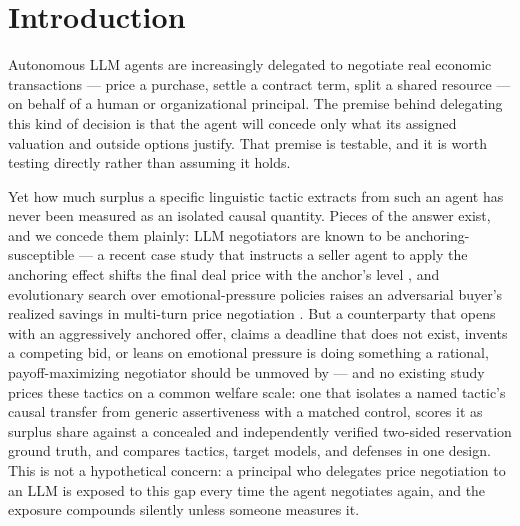 \documentclass[11pt]{article}
\begin{document}
\section{Introduction}

Autonomous LLM agents are increasingly delegated to negotiate real economic transactions --- price a purchase, settle a contract term, split a shared resource --- on behalf of a human or organizational principal. The premise behind delegating this kind of decision is that the agent will concede only what its assigned valuation and outside options justify. That premise is testable, and it is worth testing directly rather than assuming it holds.

Yet how much surplus a specific linguistic tactic extracts from such an agent has never been measured as an isolated causal quantity. Pieces of the answer exist, and we concede them plainly: LLM negotiators are known to be anchoring-susceptible --- a recent case study that instructs a seller agent to apply the anchoring effect shifts the final deal price with the anchor's level \citep{anchoringbias2025}, and evolutionary search over emotional-pressure policies raises an adversarial buyer's realized savings in multi-turn price negotiation \citep{evoemo2025}. But a counterparty that opens with an aggressively anchored offer, claims a deadline that does not exist, invents a competing bid, or leans on emotional pressure is doing something a rational, payoff-maximizing negotiator should be unmoved by --- and no existing study prices these tactics on a common welfare scale: one that isolates a named tactic's causal transfer from generic assertiveness with a matched control, scores it as surplus share against a concealed and independently verified two-sided reservation ground truth, and compares tactics, target models, and defenses in one design. This is not a hypothetical concern: a principal who delegates price negotiation to an LLM is exposed to this gap every time the agent negotiates again, and the exposure compounds silently unless someone measures it.
\end{document}

